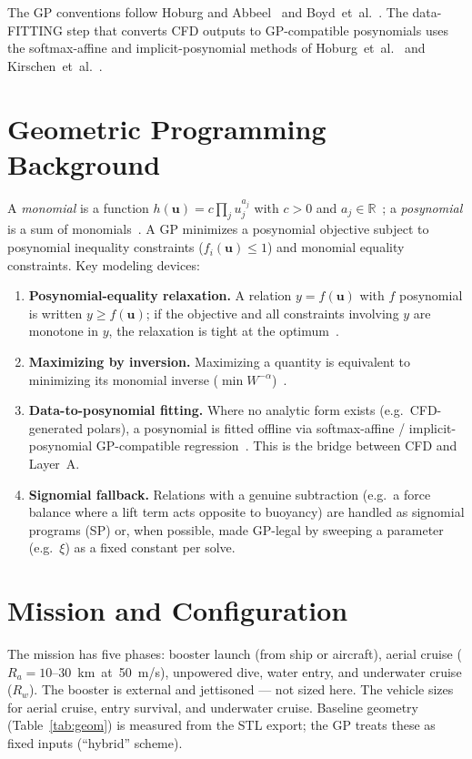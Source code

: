 \documentclass{new-aiaa}
\begin{document}
The GP conventions follow Hoburg and Abbeel~\cite{hoburg2014geometric} and
Boyd~et~al.~\cite{boyd2007tutorial}. The data-FITTING step that converts CFD outputs to GP-compatible
posynomials uses the softmax-affine and implicit-posynomial methods of
Hoburg~et~al.~\cite{hoburg2016data} and Kirschen~et~al.~\cite{kirschen2018application}.

\section{Geometric Programming Background}\label{sec:gp}
A \emph{monomial} is a function $h(\mathbf{u})=c\prod_{j}u_j^{a_j}$ with $c>0$ and
$a_j\in\mathbb{R}$~\cite{boyd2007tutorial}; a \emph{posynomial} is a sum of
monomials~\cite{hoburg2014geometric}. A GP minimizes a posynomial objective subject to
posynomial inequality constraints ($f_i(\mathbf{u})\le 1$) and monomial equality constraints.
Key modeling devices:

\begin{enumerate}
\item \textbf{Posynomial-equality relaxation.} A relation $y=f(\mathbf{u})$ with $f$ posynomial is
written $y\ge f(\mathbf{u})$; if the objective and all constraints involving $y$ are monotone in $y$,
the relaxation is tight at the optimum~\cite{hoburg2014geometric}.
\item \textbf{Maximizing by inversion.} Maximizing a quantity is equivalent to minimizing its monomial
inverse ($\min W^{-\alpha}$)~\cite{hoburg2014geometric,boyd2007tutorial}.
\item \textbf{Data-to-posynomial fitting.} Where no analytic form exists (e.g.\ CFD-generated polars),
a posynomial is fitted offline via softmax-affine / implicit-posynomial GP-compatible
regression~\cite{hoburg2016data}. This is the bridge between CFD and Layer~A.
\item \textbf{Signomial fallback.} Relations with a genuine subtraction (e.g.\ a force balance where a
lift term acts opposite to buoyancy) are handled as signomial programs (SP) or, when possible, made
GP-legal by sweeping a parameter (e.g.\ $\xi$) as a fixed constant per solve.
\end{enumerate}

\section{Mission and Configuration}
The mission has five phases: booster launch (from ship or aircraft), aerial cruise
($R_a=10$--$30$~km~at~50~m/s), unpowered dive, water entry, and underwater cruise
($R_w$). The booster is external and jettisoned — not sized here. The vehicle sizes for aerial
cruise, entry survival, and underwater cruise. Baseline geometry (Table~\ref{tab:geom}) is measured
from the STL export; the GP treats these as fixed inputs (``hybrid'' scheme).
\end{document}
